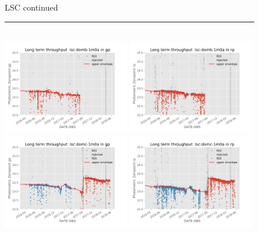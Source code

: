 \documentclass[]{spie}
\begin{document}
\begin{figure}\ContinuedFloat
\centering 
LSC continued \\ 
\rule{\textwidth}{0.4pt} \\
\includegraphics[width=0.49\textwidth]{images/photzptrend-lsc-domb-1m0a-gp.png} \hspace*{\fill}
\includegraphics[width=0.49\textwidth]{images/photzptrend-lsc-domb-1m0a-rp.png} \\
\includegraphics[width=0.49\textwidth]{images/photzptrend-lsc-domc-1m0a-gp.png} \hspace*{\fill}
\includegraphics[width=0.49\textwidth]{images/photzptrend-lsc-domc-1m0a-rp.png} \\[1ex]

\end{figure}
\end{document}

